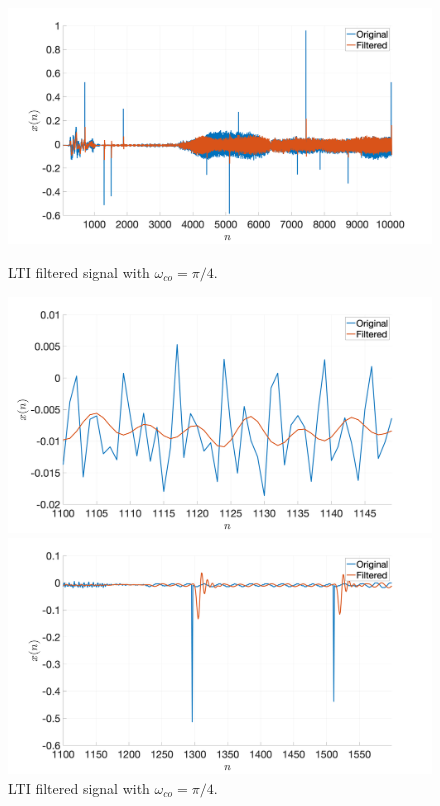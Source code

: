 \documentclass[a4paper, oneside, 11pt]{article}
\begin{document}
\begin{figure}[htbp]
	\centering
	\begin{minipage}[b]{.49\textwidth}
		\centering
		\includegraphics[width= 1.1\textwidth]{figures/R2f_zoomOut.png}
		\caption{LTI filtered signal with $\omega_{co} = \pi/4$.}
		\label{fig:Rfc}
	\end{minipage}
	\hfill
	\begin{minipage}[b]{.49\textwidth}
		\centering
		\includegraphics[width= 1.1\textwidth]{figures/R2f_smallAmp.png}
		\caption{LTI filtered signal with $\omega_{co} = \pi/4$.}
		\label{fig:R2f_smallAmp}
	\end{minipage}
	\begin{minipage}[b]{.49\textwidth}
		\centering
		\includegraphics[width= 1.1\textwidth]{figures/R2f_zoomNoise.png}

\end{minipage}
\end{figure}
\end{document}
